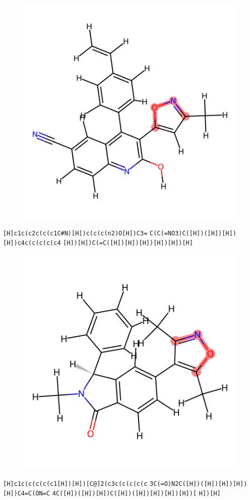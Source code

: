 \documentclass{article}
\begin{document}
\begin{figure}[ht]
\centering
    \includegraphics{mol112.png}
\end{figure}
\verb|[H]c1c(c2c(c(c1C#N)[H])c(c(c(n2)O[H])C3=| \verb|C(C(=NO3)C([H])([H])[H])[H])c4c(c(c(c(c4| \verb|[H])[H])C(=C([H])[H])[H])[H])[H])[H]|

\begin{figure}[ht]
\centering
    \includegraphics{mol113.png}
\end{figure}
\verb|[H]c1c(c(c(c(c1[H])[H])[C@]2(c3c(c(c(c(c| \verb|3C(=O)N2C([H])([H])[H])[H])[H])C4=C(ON=C| \verb|4C([H])([H])[H])C([H])([H])[H])[H])[H])[| \verb|H])[H]|
\end{document}
